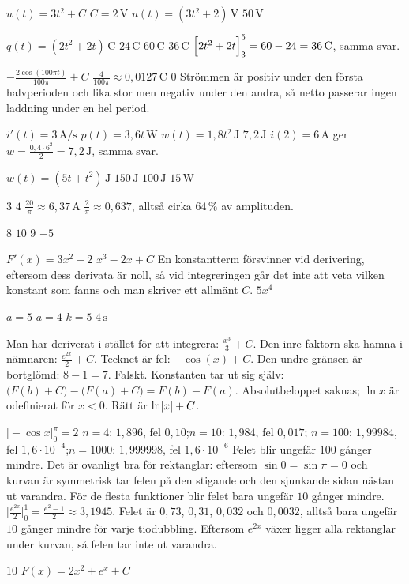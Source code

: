 \begin{facit}
  $u(t) = 3t^2 + C$  $C = 2\,\text{V}$  $u(t) = (3t^2 + 2)\,\text{V}$
 $50\,\text{V}$

  $q(t) = (2t^2 + 2t)\,\text{C}$  $24\,\text{C}$  $60\,\text{C}$
 $36\,\text{C}$  $\Bigl[2t^2 + 2t\Bigr]_3^5 = 60 - 24 = 36\,\text{C}$, samma svar.

  $-\frac{2\cos(100\pi t)}{100\pi} + C$
 $\frac{4}{100\pi} \approx 0{,}0127\,\text{C}$
 $0$
 Strömmen är positiv under den första halvperioden och lika stor men negativ under den
andra, så netto passerar ingen laddning under en hel period.

  $i'(t) = 3\,\text{A/s}$  $p(t) = 3{,}6t\,\text{W}$
 $w(t) = 1{,}8t^2\,\text{J}$  $7{,}2\,\text{J}$
 $i(2) = 6\,\text{A}$ ger $w = \frac{0{,}4 \cdot 6^2}{2} = 7{,}2\,\text{J}$, samma svar.

  $w(t) = (5t + t^2)\,\text{J}$  $150\,\text{J}$  $100\,\text{J}$
 $15\,\text{W}$

  $3$  $4$  $\frac{20}{\pi} \approx 6{,}37\,\text{A}$
 $\frac{2}{\pi} \approx 0{,}637$, alltså cirka $64\,\%$ av amplituden.

  $8$  $10$  $9$  $-5$

  $F'(x) = 3x^2 - 2$  $x^3 - 2x + C$
 En konstantterm försvinner vid derivering, eftersom dess derivata är noll, så vid
integreringen går det inte att veta vilken konstant som fanns och man skriver ett allmänt $C$.
 $5x^4$

  $a = 5$  $a = 4$  $k = 5$  $4\,\text{s}$

  Man har deriverat i stället för att integrera: $\frac{x^3}{3} + C$.
 Den inre faktorn ska hamna i nämnaren: $\frac{e^{2x}}{2} + C$.
 Tecknet är fel: $-\cos(x) + C$.
 Den undre gränsen är bortglömd: $8 - 1 = 7$.
 Falskt. Konstanten tar ut sig själv: $\bigl(F(b) + C\bigr) - \bigl(F(a) + C\bigr) =
F(b) - F(a)$.
 Absolutbeloppet saknas; $\ln x$ är odefinierat för $x < 0$. Rätt är $\ln\lvert x\rvert + C$.

  $\bigl[-\cos x\bigr]_0^{\pi} = 2$
 $n = 4$: $1{,}896$, fel $0{,}10$;\enspace $n = 10$: $1{,}984$, fel $0{,}017$;\enspace
$n = 100$: $1{,}99984$, fel $1{,}6 \cdot 10^{-4}$;\enspace $n = 1000$: $1{,}999998$, fel
$1{,}6 \cdot 10^{-6}$
 Felet blir ungefär $100$ gånger mindre. Det är ovanligt bra för rektanglar: eftersom
$\sin 0 = \sin \pi = 0$ och kurvan är symmetrisk tar felen på den stigande och den sjunkande sidan
nästan ut varandra. För de flesta funktioner blir felet bara ungefär $10$ gånger mindre.
 $\bigl[\frac{e^{2x}}{2}\bigr]_0^{1} = \frac{e^2 - 1}{2} \approx 3{,}1945$. Felet är $0{,}73$,
$0{,}31$, $0{,}032$ och $0{,}0032$, alltså bara ungefär $10$ gånger mindre för varje tiodubbling.
Eftersom $e^{2x}$ växer ligger alla rektanglar under kurvan, så felen tar inte ut varandra.

  $10$  $F(x) = 2x^2 + e^x + C$

\end{facit}

